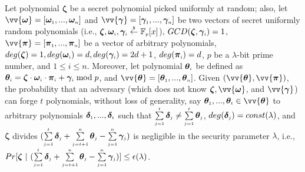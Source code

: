 \vs
\begin{theorem}\label{Unforgeable-Polynomials-Linear-Combination}
%
 Let polynomial $\bm\zeta$ be a secret polynomial picked uniformly at random; also, let   $\vv{\bm\omega}=[\bm\omega_{\st 1},..., \bm\omega_{\st n}]$ and $\vv{\bm\gamma}=[\bm\gamma_{\st 1},..., \bm\gamma_{\st n}]$ be two vectors of secret uniformly random polynomials (i.e., ${\bm\zeta}, \bm\omega_{\scriptscriptstyle i}, \bm\gamma_{\scriptscriptstyle i} \stackrel{\scriptscriptstyle\$}\leftarrow \mathbb F_{\scriptscriptstyle p}[x]$), $GCD(\bm\zeta,  \bm\gamma_{\scriptscriptstyle i})=1$,  $\vv{\bm\pi}=[\bm\pi_{\st 1},..., \bm\pi_{\st n}]$ be a vector of arbitrary polynomials,   $deg(\bm\zeta)= 1, deg(\bm\omega_{\scriptscriptstyle i})=d,  deg(\bm\gamma_{\scriptscriptstyle i})= 2d+1$,  $deg(\bm\pi_{\scriptscriptstyle i})=d$,  $p$ be a $\lambda$-bit prime number, and $1\leq i \leq n$. Moreover, let polynomial $\bm\theta_{\scriptscriptstyle i}$ be defined as  $\bm\theta_{\scriptscriptstyle i}=\bm\zeta\cdot \bm\omega_{\scriptscriptstyle i}\cdot \bm\pi_{\scriptscriptstyle i}+ \bm\gamma_{\scriptscriptstyle i} \bmod p$, and $\vv{\bm\theta} = [\bm\theta_{\st 1},..., \bm\theta_{\st n}]$.  Given $(\vv{\bm\theta}, \vv{\bm\pi})$, the probability that an adversary (which does not know $\bm\zeta, \vv{\bm\omega}$, and $\vv{\bm\gamma}$) can forge $t$ polynomials, without loss of generality, say $\bm\theta_{\st 1},..., \bm\theta_{\st t} \in \vv{\bm\theta}$ to arbitrary polynomials $\bm\delta_{\scriptscriptstyle 1},..., \bm\delta_{\scriptscriptstyle t}$ such that   $\sum\limits_{\scriptscriptstyle j=1}^{\scriptscriptstyle t}\bm\delta_{\scriptscriptstyle j}\neq \sum\limits_{\scriptscriptstyle j=1}^{\scriptscriptstyle t}\bm\theta_{\scriptscriptstyle j}$, $deg(\bm\delta_{\scriptscriptstyle j})= const(\lambda)$, and $\bm\zeta$ divides $(\sum\limits_{\scriptscriptstyle j=1}^{\scriptscriptstyle t}\bm\delta_{\scriptscriptstyle j} + \sum\limits_{\scriptscriptstyle j=t+1}^{\scriptscriptstyle n}\bm\theta_{\scriptscriptstyle j} - \sum\limits_{\scriptscriptstyle j=1}^{\scriptscriptstyle n}\bm\gamma_{\scriptscriptstyle j} )$ is negligible in the security parameter $\lambda$, i.e.,  
%
$Pr[ \bm\zeta \ | \ (\sum\limits_{\scriptscriptstyle j=1}^{\scriptscriptstyle t}\bm\delta_{\scriptscriptstyle j} + \sum\limits_{\scriptscriptstyle j=t+1}^{\scriptscriptstyle n}\bm\theta_{\scriptscriptstyle j} - \sum\limits_{\scriptscriptstyle j=1}^{\scriptscriptstyle n}\bm\gamma_{\scriptscriptstyle j} ) ]\leq \epsilon(\lambda)$.
%
\end{theorem}



